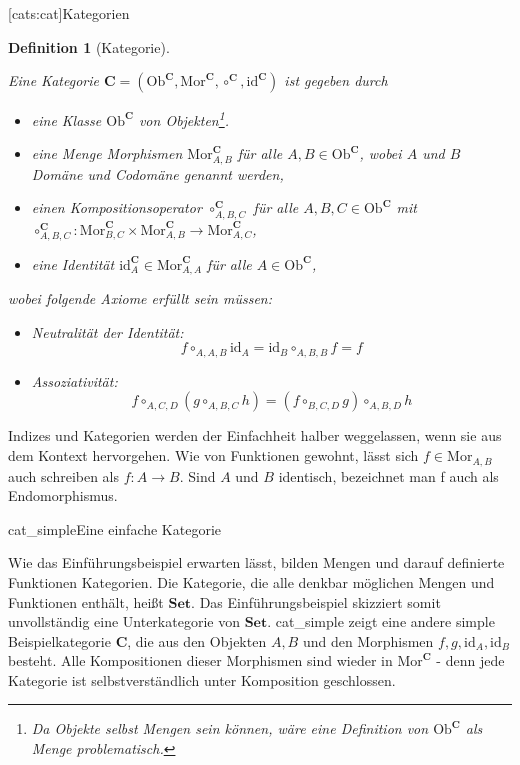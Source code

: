 \documentclass[11pt, a4paper, bibgerm]{scrbook}
\newcommand\lsection{}
\newcommand\abb{}
\newcommand\fig{}
\newcommand\ato{\rightarrow} %
\newtheorem{defini}{Definition}
\newcommand{\defi}[2]{%
  \begin{defini}[#1]
    \label{def:#1}
    #2
  \end{defini}
}
\begin{document}
\lsection[cats:cat]{Kategorien}

\defi{Kategorie}{
Eine Kategorie $\mathbf{C} = (\mathrm{Ob}^\mathbf{C}, \mathrm{Mor}^\mathbf{C},
\circ^\mathbf{C}, \mathrm{id}^\mathbf{C})$ ist gegeben durch
\begin{itemize}
\item eine Klasse $\mathrm{Ob}^\mathbf{C}$ von Objekten\footnote{Da Objekte selbst Mengen
    sein können, wäre eine Definition von $\mathrm{Ob}^\mathbf{C}$ als Menge problematisch.}.
\item eine Menge Morphismen $\mathrm{Mor}^\mathbf{C}_{A,B}$ für alle $ A,B \in
  \mathrm{Ob}^\mathbf{C}$, wobei $A$ und $B$ Domäne und Codomäne genannt werden,
\item einen Kompositionsoperator $\circ^\mathbf{C}_{A,B,C}$ für alle $
  A,B,C \in \mathrm{Ob}^\mathbf{C}$ mit \\
  $\circ^\mathbf{C}_{A,B,C} : \mathrm{Mor}^\mathbf{C}_{B,C} \times
  \mathrm{Mor}^\mathbf{C}_{A,B} \rightarrow \mathrm{Mor}^\mathbf{C}_{A,C}$,
\item eine Identität $\mathrm{id}^\mathbf{C}_A \in \mathrm{Mor}^\mathbf{C}_{A,A}$ für alle $ A \in \mathrm{Ob}^\mathbf{C}$,
\end{itemize}
wobei folgende Axiome erfüllt sein müssen:
\begin{itemize}
\item Neutralität der Identität: $$f \circ_{A,A,B} \mathrm{id}_A = \mathrm{id}_B \circ_{A,B,B} f = f$$
\item Assoziativität:
  $$f \circ_{A,C,D} (g \circ_{A,B,C} h) = (f \circ_{B,C,D} g) \circ_{A,B,D}h$$
\end{itemize}
}

Indizes und Kategorien werden der Einfachheit halber weggelassen, wenn
sie aus dem Kontext hervorgehen. Wie von Funktionen gewohnt, lässt sich
$f \in \mathrm{Mor}_{A,B}$ auch schreiben als $f : A \ato B$. Sind $A$
und $B$ identisch, bezeichnet man f auch als Endomorphismus.

\fig{cat_simple}{Eine einfache Kategorie}

Wie das Einführungsbeispiel erwarten lässt, bilden Mengen und darauf
definierte Funktionen Kategorien. Die Kategorie, die alle denkbar
möglichen Mengen und Funktionen enthält, heißt $\mathbf{Set}$. Das
Einführungsbeispiel skizziert somit unvollständig eine Unterkategorie
von $\mathbf{Set}$. \abb{cat_simple} zeigt eine andere simple
Beispielkategorie $\mathbf{C}$, die aus den Objekten $A, B$ und den
Morphismen $f, g, \mathrm{id}_A, \mathrm{id}_B$ besteht. Alle
Kompositionen dieser Morphismen sind wieder in
$\mathrm{Mor}^{\mathbf{C}}$ - denn jede Kategorie ist selbstverständlich
unter Komposition geschlossen.
\end{document}
